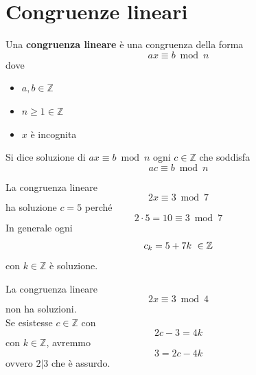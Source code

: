 \documentclass[a4paper,12pt, oneside]{book}
\begin{document}
	\section{Congruenze lineari}
		\begin{definizione}
			Una \textbf{congruenza lineare} è una congruenza della forma $$ax \equiv b \bmod n$$ dove \begin{itemize}
				\item $a,b \in \mathbb{Z}$
				\item $n \geq 1 \in \mathbb{Z}$
				\item $x$ è incognita
			\end{itemize}
			Si dice soluzione di $ax \equiv b \bmod n$ ogni $c \in \mathbb{Z}$ che soddisfa $$ac \equiv b \bmod n$$
		\end{definizione}
		\begin{shaded}
			\begin{esempio}
				La congruenza lineare $$2x \equiv 3 \bmod 7$$ ha soluzione $c=5$ perché $$2 \cdot 5 = 10 \equiv 3 \bmod 7$$
				In generale ogni $$c_k = 5+7k \mbox{\space} \in \mathbb{Z}$$ con $k \in \mathbb{Z}$ è soluzione.
			\end{esempio}
			\begin{esempio}
				La congruenza lineare $$2x \equiv 3 \bmod 4$$ non ha soluzioni.\\
				Se esistesse $c \in \mathbb{Z}$ con $$2c-3=4k$$ con $k \in \mathbb{Z}$, avremmo $$3 = 2c-4k$$ ovvero $2|3$ che è assurdo.
			\end{esempio}
		\end{shaded}
\end{document}

